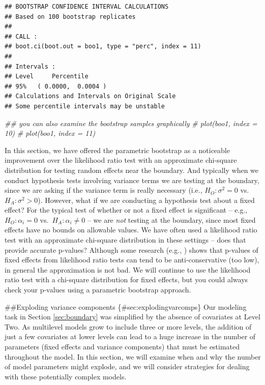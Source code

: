 \documentclass[
]{krantz}
\newenvironment{Shaded}{\begin{snugshade}}{\end{snugshade}}
\newcommand{\CommentTok}[1]{\textcolor[rgb]{0.37,0.37,0.37}{\textit{#1}}}
\begin{document}
\begin{verbatim}
## BOOTSTRAP CONFIDENCE INTERVAL CALCULATIONS
## Based on 100 bootstrap replicates
## 
## CALL : 
## boot.ci(boot.out = boo1, type = "perc", index = 11)
## 
## Intervals : 
## Level     Percentile     
## 95%   ( 0.0000,  0.0004 )  
## Calculations and Intervals on Original Scale
## Some percentile intervals may be unstable
\end{verbatim}

\begin{Shaded}
\begin{Highlighting}[]
\CommentTok{## you can also examine the bootstrap samples graphically}
\CommentTok{# plot(boo1, index = 10)}
\CommentTok{# plot(boo1, index = 11)}
\end{Highlighting}
\end{Shaded}

In this section, we have offered the parametric bootstrap as a noticeable improvement over the likelihood ratio test with an approximate chi-square distribution for testing random effects near the boundary. And typically when we conduct hypothesis tests involving variance terms we are testing at the boundary, since we are asking if the variance term is really necessary (i.e., \(H_O: \sigma^2=0\) vs.~\(H_A: \sigma^2 > 0\)). However, what if we are conducting a hypothesis test about a fixed effect? For the typical test of whether or not a fixed effect is significant -- e.g., \(H_O: \alpha_i=0\) vs.~\(H_A: \alpha_i \neq 0\) -- we are \emph{not} testing at the boundary, since most fixed effects have no bounds on allowable values. We have often used a likelihood ratio test with an approximate chi-square distribution in these settings -- does that provide accurate p-values? Although some research (e.g., \citet{Faraway2005}) shows that p-values of fixed effects from likelihood ratio tests can tend to be anti-conservative (too low), in general the approximation is not bad. We will continue to use the likelihood ratio test with a chi-square distribution for fixed effects, but you could always check your p-values using a parametric bootstrap approach.

\#\#Exploding variance components \{\#sec:explodingvarcomps\}
Our modeling task in Section \ref{sec:boundary} was simplified by the absence of covariates at Level Two. As multilevel models grow to include three or more levels, the addition of just a few covariates at lower levels can lead to a huge increase in the number of parameters (fixed effects and variance components) that must be estimated throughout the model. In this section, we will examine when and why the number of model parameters might explode, and we will consider strategies for dealing with these potentially complex models.
\end{document}
